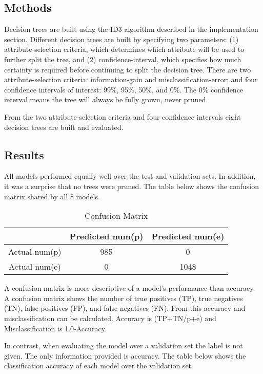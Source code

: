 \documentclass{IEEEtran}
\begin{document}
\subsection{Methods}
Decision trees are built using the ID3 algorithm described in the
implementation section. Different decision trees are built by
specifying two parameters: (1) attribute-selection criteria, which
determines which attribute will be used to further split the tree, and (2)
confidence-interval, which specifies how much certainty is required before
continuing to split the decision tree.  There are two
attribute-selection criteria: information-gain and
misclassification-error; and four confidence intervals of interest:
99\%,  95\%, 50\%, and 0\%. The 0\% confidence interval means the tree
will always be fully grown, never pruned.

From the two attribute-selection criteria and four confidence
intervals eight decision trees are built and evaluated.

\subsection{Results}
All models performed equally well over the test and validation
sets. In addition,  it was a surprise that no trees were pruned. The
table below shows the confusion matrix shared by all 8 models.

\begin{table}[ht]
  \caption{Confusion Matrix}
  \centering
  \begin{tabular}{c c c }
  \hline\hline
                & Predicted num(p) & Predicted num(e) \\ [0.5ex]
  \hline
  Actual num(p) &              985 &                0 \\
  Actual num(e) &                0 &             1048 \\ [1ex]
  \hline
  \end{tabular}
  \label{table:nonlin}
\end{table}

A confusion matrix is more descriptive of a model's performance than
accuracy. A confusion matrix shows the number of true positives (TP), true
negatives (TN), false positives (FP), and false negatives (FN). From this accuracy
and misclassification can be calculated. Accuracy is (TP+TN/p+e) and
Misclassification is 1.0-Accuracy.

In contrast, when evaluating the model over a validation set the label
is not given. The only information provided is accuracy. The table
below shows the classification accuracy of each model over the
validation set.
\end{document}
